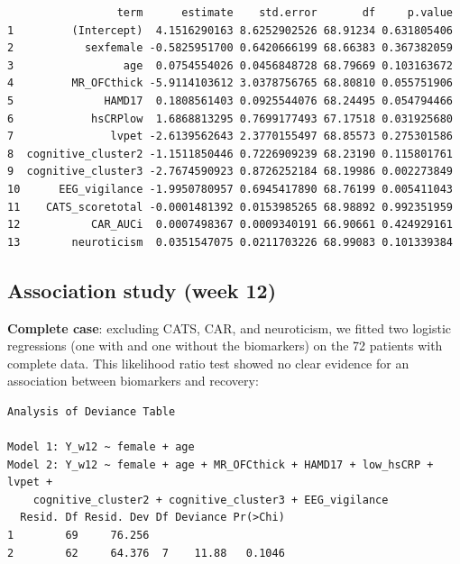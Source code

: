 \documentclass[12pt]{article}
\begin{document}
\begin{verbatim}
                 term      estimate    std.error       df     p.value
1         (Intercept)  4.1516290163 8.6252902526 68.91234 0.631805406
2           sexfemale -0.5825951700 0.6420666199 68.66383 0.367382059
3                 age  0.0754554026 0.0456848728 68.79669 0.103163672
4         MR_OFCthick -5.9114103612 3.0378756765 68.80810 0.055751906
5              HAMD17  0.1808561403 0.0925544076 68.24495 0.054794466
6            hsCRPlow  1.6868813295 0.7699177493 67.17518 0.031925680
7               lvpet -2.6139562643 2.3770155497 68.85573 0.275301586
8  cognitive_cluster2 -1.1511850446 0.7226909239 68.23190 0.115801761
9  cognitive_cluster3 -2.7674590923 0.8726252184 68.19986 0.002273849
10      EEG_vigilance -1.9950780957 0.6945417890 68.76199 0.005411043
11    CATS_scoretotal -0.0001481392 0.0153985265 68.98892 0.992351959
12           CAR_AUCi  0.0007498367 0.0009340191 66.90661 0.424929161
13        neuroticism  0.0351547075 0.0211703226 68.99083 0.101339384
\end{verbatim}

\bigskip

\subsection{Association study (week 12)}
\label{sec:org4429a7f}

\textbf{Complete case}: excluding CATS, CAR, and neuroticism, we fitted two
logistic regressions (one with and one without the biomarkers) on the
72 patients with complete data. This likelihood ratio test showed no
clear evidence for an association between biomarkers and recovery:
\begin{verbatim}
Analysis of Deviance Table

Model 1: Y_w12 ~ female + age
Model 2: Y_w12 ~ female + age + MR_OFCthick + HAMD17 + low_hsCRP + lvpet + 
    cognitive_cluster2 + cognitive_cluster3 + EEG_vigilance
  Resid. Df Resid. Dev Df Deviance Pr(>Chi)
1        69     76.256                     
2        62     64.376  7    11.88   0.1046
\end{verbatim}
\end{document}
